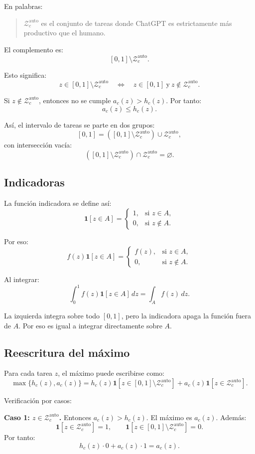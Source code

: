 \documentclass[11pt,a4paper]{article}
\newcommand{\Zauto}{\mathcal{Z}^{\mathrm{auto}}_c}
\newcommand{\one}{\mathbf{1}}
\newcommand{\dd}{\,dz}
\begin{document}
En palabras:

\begin{quote}
\(\Zauto\) es el conjunto de tareas donde ChatGPT es estrictamente más productivo que el humano.
\end{quote}

El complemento es:
\[
[0,1]\setminus \Zauto.
\]

Esto significa:
\[
z\in[0,1]\setminus \Zauto
\quad \Longleftrightarrow \quad
z\in[0,1]\ \text{y}\ z\notin\Zauto.
\]

Si \(z\notin\Zauto\), entonces no se cumple \(a_c(z)>h_c(z)\). Por tanto:
\[
a_c(z)\leq h_c(z).
\]

Así, el intervalo de tareas se parte en dos grupos:
\[
[0,1]=([0,1]\setminus\Zauto)\cup \Zauto,
\]
con intersección vacía:
\[
([0,1]\setminus\Zauto)\cap\Zauto=\varnothing.
\]

\subsection{Indicadoras}

La función indicadora se define así:
\[
\one[z\in A]=
\begin{cases}
1, & \text{si }z\in A,\\
0, & \text{si }z\notin A.
\end{cases}
\]

Por eso:
\[
f(z)\one[z\in A]=
\begin{cases}
f(z), & \text{si }z\in A,\\
0, & \text{si }z\notin A.
\end{cases}
\]

Al integrar:
\[
\int_0^1 f(z)\one[z\in A]\dd=\int_A f(z)\dd.
\]

La izquierda integra sobre todo \([0,1]\), pero la indicadora apaga la función fuera de \(A\). Por eso es igual a integrar directamente sobre \(A\).

\subsection{Reescritura del máximo}

Para cada tarea \(z\), el máximo puede escribirse como:
\[
\max\{h_c(z),a_c(z)\}
=h_c(z)\one[z\in[0,1]\setminus\Zauto]+a_c(z)\one[z\in\Zauto].
\]

Verificación por casos:

\textbf{Caso 1: \(z\in\Zauto\).} Entonces \(a_c(z)>h_c(z)\). El máximo es \(a_c(z)\). Además:
\[
\one[z\in\Zauto]=1,\qquad
\one[z\in[0,1]\setminus\Zauto]=0.
\]
Por tanto:
\[
h_c(z)\cdot 0+a_c(z)\cdot 1=a_c(z).
\]
\end{document}

